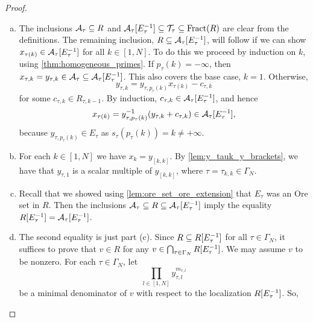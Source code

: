 \begin{proof}
	\leavevmode
	\begin{enumerate}[(a)]
		\item The inclusions $\mathcal{A}_\tau \subseteq R$ and $\mathcal{A}_\tau[E^{-1}_\tau] \subseteq \mathcal{T}_\tau
			      \subseteq \operatorname{Fract}(R)$ are clear from the definitions. The remaining inclusion, $R
			      \subseteq \mathcal{A}_\tau[E^{-1}_\tau]$, will follow if we can show $x_{\tau(k)} \in
			      \mathcal{A}_\tau[E^{-1}_\tau]$ for all $k \in [1, N]$. To do this we proceed by induction on
		      $k$, using \cref{thm:homogeneous_primes}. If $p_\tau(k) = -\infty$, then $x_{\tau, k} =
			      y_{\tau, k} \in \mathcal{A}_\tau \subseteq \mathcal{A}_\tau[E^{-1}_\tau]$. This also covers the base
		      case, $k=1$. Otherwise,
		      \begin{equation*}
			      y_{\tau, k} = y_{\tau, p_\tau(k)}x_{\tau(k)} - c_{\tau, k}
		      \end{equation*}
		      for some $c_{\tau, k} \in R_{\tau, k-1}$. By induction, $c_{\tau, k} \in
			      \mathcal{A}_\tau[E^{-1}_\tau]$, and hence
		      \begin{equation*}
			      x_{\tau(k)} = y_{\tau, p_\tau(k)}^{-1} (y_{\tau, k} + c_{\tau, k}) \in \mathcal{A}_\tau[E^{-1}_\tau],
		      \end{equation*}
		      because $y_{\tau, p_\tau(k)} \in E_\tau$ as $s_\tau(p_\tau(k)) = k \neq +\infty$.
		\item For each $k \in [1, N]$ we have $x_k = y_{[k , k]}$. By \cref{lem:y_tauk_y_brackets},
		      we have that $y_{\tau, 1}$ is a scalar multiple of $y_{[k,k]}$, where $\tau =
			      \tau_{k,k} \in \Gamma_N$.
		\item Recall that we showed using \cref{lem:ore_set_ore_extension} that $E_\tau$ was an Ore
		      set in $R$. Then the inclusions $\mathcal{A}_\tau \subseteq R \subseteq \mathcal{A}_\tau[E^{-1}_\tau]$
		      imply the equality $R[E^{-1}_\tau] = \mathcal{A}_\tau[E^{-1}_\tau]$.
		\item The second equality is just part (c). Since $R \subseteq R[E^{-1}_\tau]$ for all $\tau
			      \in \Gamma_N$, it suffices to prove that $v\in R$ for any $v \in \bigcap_{\tau\in
				      \Gamma_N} R[E^{-1}_\tau]$. We may assume $v$ to be nonzero. For each $\tau \in
			      \Gamma_N$, let
		      \begin{equation*}
			      \prod_{l \in [1, N]}y_{\tau, l}^{m_{\tau, l}}
		      \end{equation*}
		      be a minimal denominator of $v$ with respect to the localization $R[E^{-1}_\tau]$. So,

\end{enumerate}
\end{proof}
